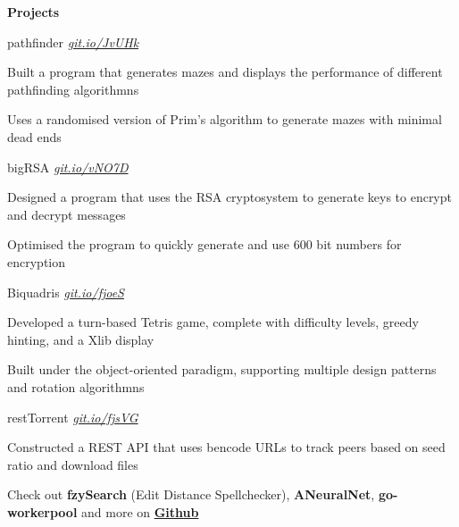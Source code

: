 \documentclass{resume} %
\begin{document}

\begin{rSection}{\textbf{Projects}}

\begin{rSubsection}{pathfinder}
		{\em {\href{https://github.com/MSJawad/pathfinder}
				{git.io/JvUHk}}}
		{}
		
		\item Built a program that generates mazes and displays the performance of different pathfinding algorithmns
		\item	Uses a randomised version of Prim's algorithm to generate mazes with minimal dead ends
	\end{rSubsection}

  \begin{rSubsection}{bigRSA}
	  {\em {\href{https://github.com/MSJawad/bigRSA}
		    {git.io/vNO7D}}}
	  {}

    \item Designed a program that uses the RSA cryptosystem to generate keys to encrypt and decrypt messages
    \item Optimised the program to quickly generate and use 600 bit numbers for encryption
    
    \end{rSubsection}
    
   \begin{rSubsection}{Biquadris}
	  {\em {\href{https://github.com/MiltonIp/Biquadris}
		    {git.io/fjoeS}}}
	  {}

    \item Developed a turn-based Tetris game, complete with difficulty levels, greedy hinting, and a Xlib display
    \item Built under the object{-}oriented paradigm, supporting multiple design patterns and rotation algorithmns
 
  \end{rSubsection}
	
	  \begin{rSubsection}{restTorrent}
		{\em {\href{https://github.com/MSJawad/restTorrent}
				{git.io/fjsVG}}}
		{}
		
		\item  Constructed a REST API that uses bencode URLs to track peers based on seed ratio and download files
				
	\end{rSubsection}	
	
  \begin{rMinisection}
    \item {Check out}{ \textbf{fzySearch} (Edit Distance Spellchecker)},
      {\textbf{ANeuralNet}}, {\textbf{go-workerpool}} and more on
      \href{https://github.com/MSJawad}{\textbf{Github}}
  \end{rMinisection}
\end{rSection}
\end{document}
